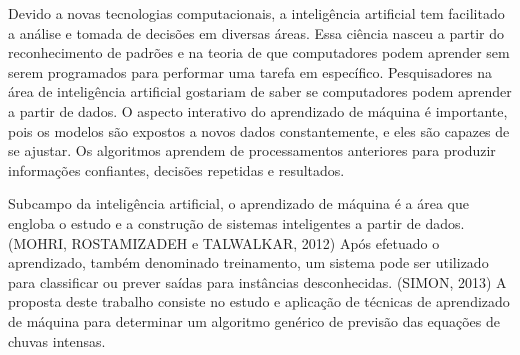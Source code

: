 Devido a novas tecnologias computacionais, a inteligência artificial tem facilitado a análise e tomada de decisões em diversas áreas. Essa ciência nasceu a partir do reconhecimento de padrões e na teoria de que computadores podem aprender sem serem programados para performar uma tarefa em específico. Pesquisadores na área de inteligência artificial gostariam de saber se computadores podem aprender a partir de dados.  O aspecto interativo do aprendizado de máquina é importante, pois os modelos são expostos a novos dados constantemente, e eles são capazes de se ajustar. Os algoritmos aprendem de processamentos anteriores para produzir informações confiantes, decisões repetidas e resultados.

Subcampo da inteligência artificial, o aprendizado de máquina é a área que engloba o estudo e a construção de sistemas inteligentes a partir de dados. (MOHRI, ROSTAMIZADEH e TALWALKAR, 2012) Após efetuado o aprendizado, também denominado treinamento, um sistema pode ser utilizado para classificar ou prever saídas para instâncias desconhecidas. (SIMON, 2013) A proposta deste trabalho consiste no estudo e aplicação de técnicas de aprendizado de máquina para determinar um algoritmo genérico de previsão das equações de chuvas intensas.
